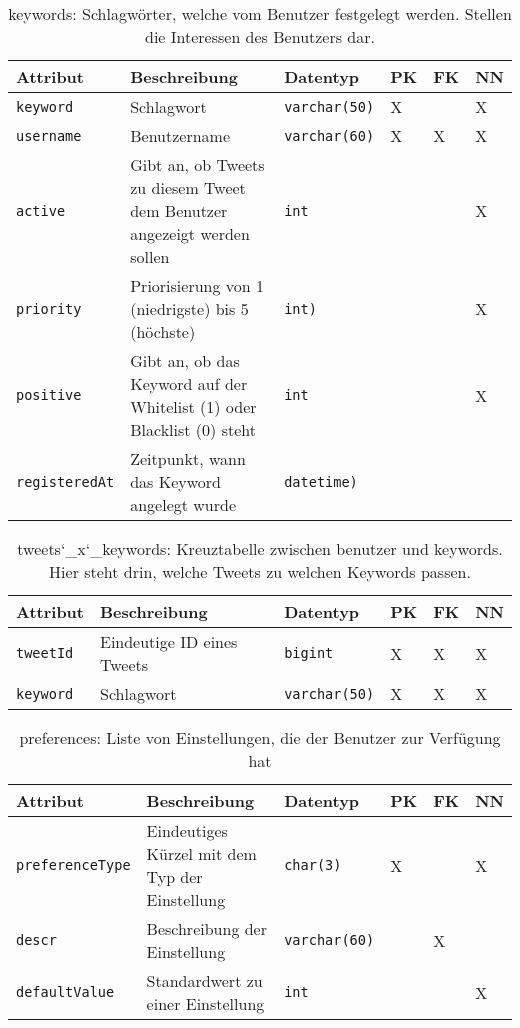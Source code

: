 \begin{table}[!ht]
	\caption{keywords: Schlagwörter, welche vom Benutzer festgelegt werden. Stellen die Interessen des Benutzers dar.}
	\begin{tabular}{p{3cm}p{5cm}p{2cm}p{1cm}p{1cm}p{1cm}}
		\toprule 
		\textbf{Attribut} & \textbf{Beschreibung} & \textbf{Datentyp} & \textbf{PK} & \textbf{FK} & \textbf{NN} \\
		\hline 
		\texttt{keyword} &  Schlagwort  & \texttt{varchar(50)} & X & & X   \\
		\texttt{username} & Benutzername & \texttt{varchar(60)} & X & X & X   \\
		\texttt{active} &  Gibt an, ob Tweets zu diesem Tweet dem Benutzer angezeigt werden sollen & \texttt{int} & & & X   \\
		\texttt{priority} &  Priorisierung von 1 (niedrigste) bis 5 (höchste) & \texttt{int)} & & & X  \\
		\texttt{positive} & Gibt an, ob das Keyword auf der Whitelist (1) oder Blacklist (0) steht & \texttt{int} & & & X \\
		\texttt{registeredAt} & Zeitpunkt, wann das Keyword angelegt wurde & \texttt{datetime)} & & &   \\
		\bottomrule
	\end{tabular}
\end{table}

\begin{table}[!ht]
	\caption{tweets\char`_x\char`_keywords: Kreuztabelle zwischen benutzer und keywords. Hier steht drin, welche Tweets zu welchen Keywords passen.}
	\begin{tabular}{p{3cm}p{5cm}p{2cm}p{1cm}p{1cm}p{1cm}}
		\toprule 
		\textbf{Attribut} & \textbf{Beschreibung} & \textbf{Datentyp} & \textbf{PK} & \textbf{FK} & \textbf{NN} \\
		\hline 
		\texttt{tweetId} &  Eindeutige ID eines Tweets  & \texttt{bigint} & X & X & X   \\
		\texttt{keyword} & Schlagwort & \texttt{varchar(50)} & X & X & X   \\
		\bottomrule
	\end{tabular}
\end{table}

\begin{table}[!ht]
	\caption{preferences: Liste von Einstellungen, die der Benutzer zur Verfügung hat}
	\begin{tabular}{p{3cm}p{5cm}p{2cm}p{1cm}p{1cm}p{1cm}}
		\toprule 
		\textbf{Attribut} & \textbf{Beschreibung} & \textbf{Datentyp} & \textbf{PK} & \textbf{FK} & \textbf{NN} \\
		\hline 
		\texttt{preferenceType} & Eindeutiges Kürzel mit dem Typ der Einstellung  & \texttt{char(3)} & X & & X   \\
		\texttt{descr} & Beschreibung der Einstellung & \texttt{varchar(60)} &  & X   \\
		\texttt{defaultValue} &  Standardwert zu einer Einstellung & \texttt{int} & & & X   \\
		\bottomrule
	\end{tabular}
\end{table}

